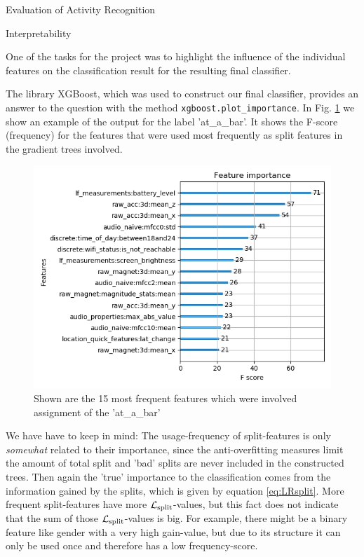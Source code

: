 \begin{section}{Evaluation of Activity Recognition}
	
\begin{subsection}{Interpretability}
	
	One of the tasks for the project was to highlight the influence of the individual features on the classification result for the resulting final classifier.
	
	The library XGBoost, which was used to construct our final classifier, provides an answer to the question with the method \texttt{xgboost.plot\_importance}. In Fig. \ref{abb:feature_importance} we show an example of the output for the label 'at\_a\_bar'. It shows the F-score (frequency) for the features that were used most frequently as split features in the gradient trees involved.
	  
	
	\begin{figure}[H]
		\begin{center}
			\includegraphics[width=.8\textwidth]{images/feature_importance.png}
			\caption{Shown are the 15 most frequent features which were involved assignment of the 'at\_a\_bar'}
			\label{abb:feature_importance}
		\end{center}		
	\end{figure}

    We have have to keep in mind: The usage-frequency of split-features is only \textit{somewhat} related to their importance, since the anti-overfitting measures limit the amount of total split and 'bad' splits are never included in the constructed trees. Then again the 'true' importance to the classification comes from the information gained by the splits, which is given by equation \ref{eq:LRsplit}. More frequent split-features have more $\mathcal{L}_\text{split}$-values, but this fact does not indicate that the sum of those $\mathcal{L}_\text{split}$-values is big. For example, there might be a binary feature like gender with a very high gain-value, but due to its structure it can only be used once and therefore has a low frequency-score.
    

\end{subsection}
\end{section}
